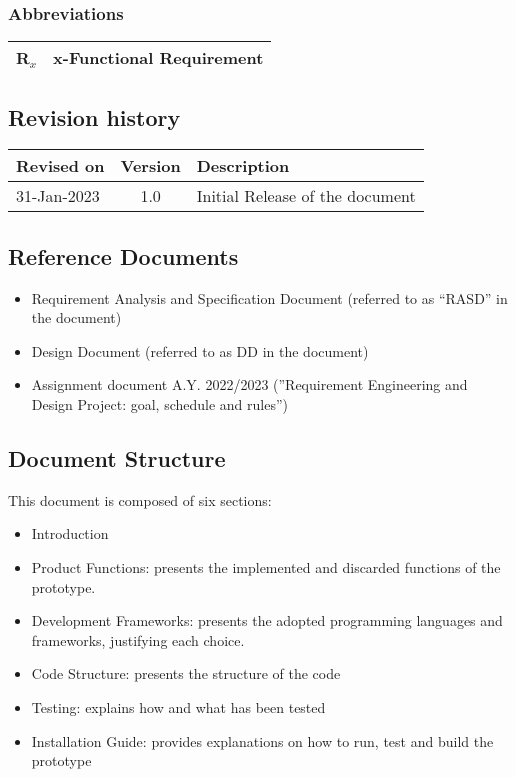 \subsubsection{Abbreviations}
\begin{table}[H]
    \begin{tabularx}{\textwidth}{cX}
        \toprule
        \textbf{R$_x$} & x-Functional Requirement \\
        \bottomrule
    \end{tabularx}
\end{table}
\subsection{Revision history}
\begin{table}[H]
    \begin{tabularx}{\textwidth}{lcl}
        \toprule
        \textbf{Revised on} & Version & Description                     \\ \midrule
        31-Jan-2023         & 1.0     & Initial Release of the document \\
        \bottomrule
    \end{tabularx}
\end{table}
\subsection{Reference Documents}
\begin{itemize}
    \item Requirement Analysis and Specification Document (referred to as “RASD” in the document)
    \item Design Document (referred to as DD in the document)
    \item Assignment document A.Y. 2022/2023 (”Requirement Engineering and Design Project: goal, schedule
          and rules”)
\end{itemize}
\subsection{Document Structure}
This document is composed of six sections:
\begin{itemize}
    \item Introduction
    \item Product Functions: presents the implemented and discarded functions of the prototype.
    \item Development Frameworks: presents the adopted programming languages and frameworks, justifying each choice.
    \item Code Structure: presents the structure of the code
    \item Testing: explains how and what has been tested
    \item Installation Guide: provides explanations on how to run, test and build the prototype
\end{itemize}